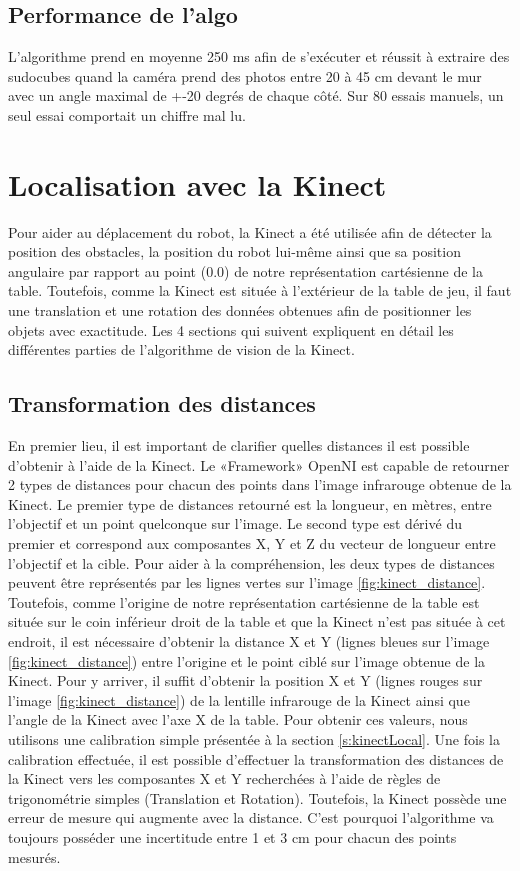 \subsection{Performance de l'algo}
L'algorithme prend en moyenne 250 ms afin de s'exécuter et réussit à extraire des sudocubes quand la caméra prend des photos entre 20 à 45 cm devant le mur avec un angle maximal de +-20 degrés de chaque côté. Sur 80 essais manuels, un seul essai comportait un chiffre mal lu.

\section{Localisation avec la Kinect}

Pour aider au déplacement du robot, la Kinect a été utilisée afin de détecter la position des obstacles, la position du robot lui-même ainsi que sa position angulaire par rapport au point (0.0) de notre représentation cartésienne de la table. Toutefois, comme la Kinect est située à l'extérieur de la table de jeu, il faut une translation et une rotation des données obtenues afin de positionner les objets avec exactitude. Les 4 sections qui suivent expliquent en détail les différentes parties de l'algorithme de vision de la Kinect.

\subsection{Transformation des distances}
En premier lieu, il est important de clarifier quelles distances il est possible d'obtenir à l'aide de la Kinect. Le «Framework» OpenNI est capable de retourner 2 types de distances pour chacun des points dans l'image infrarouge obtenue de la Kinect. Le premier type de distances retourné est la longueur, en mètres, entre l'objectif et un point quelconque sur l'image. Le second type est dérivé du premier et correspond aux composantes X, Y et Z du vecteur de longueur entre l'objectif et la cible. Pour aider à la compréhension, les deux types de distances peuvent être représentés par les lignes vertes sur l'image \ref{fig:kinect_distance}. Toutefois, comme l'origine de notre représentation cartésienne de la table est située sur le coin inférieur droit de la table et que la Kinect n'est pas située à cet endroit, il est nécessaire d'obtenir la distance X et Y (lignes bleues sur l'image \ref{fig:kinect_distance}) entre l'origine et le point ciblé sur l'image obtenue de la Kinect. Pour y arriver, il suffit d'obtenir la position X et Y (lignes rouges sur l'image \ref{fig:kinect_distance}) de la lentille infrarouge de la Kinect ainsi que l'angle de la Kinect avec l'axe X de la table. Pour obtenir ces valeurs, nous utilisons une calibration simple présentée à la section \ref{s:kinectLocal}. Une fois la calibration effectuée, il est possible d'effectuer la transformation des distances de la Kinect vers les composantes X et Y recherchées à l'aide de règles de trigonométrie simples (Translation et Rotation). Toutefois, la Kinect possède une erreur de mesure qui augmente avec la distance. C'est pourquoi l'algorithme va toujours posséder une incertitude entre 1 et 3 cm pour chacun des points mesurés.


